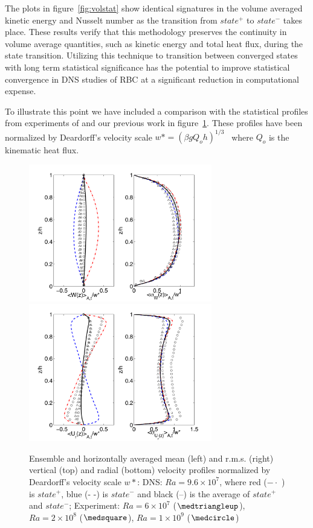 \documentclass[twocolumn,10pt]{tsfp}
\begin{document}
The plots in figure~\ref{fig:volstat} show identical signatures in the volume averaged kinetic energy and Nusselt number as the transition from $state^+$ to $state^-$ takes place.  These results verify that this methodology preserves the continuity in volume average quantities, such as kinetic energy and total heat flux, during the state transition.
Utilizing this technique to transition between converged states with long term statistical significance has the potential to improve statistical convergence in DNS studies of RBC at a significant reduction in computational expense.  
 
To illustrate this point we have included a comparison with the statistical profiles from experiments of \cite{fernandes2001spatial} and our previous work \citep{sakievich2016large} in figure~\ref{fig:profs}. These profiles have been normalized by Deardorff's velocity scale $w*=(\beta g Q_o h)^{1/3}$~\citep{deardorff1970convective} where $Q_o$ is the kinematic heat flux.
\begin{figure}
\centering
\includegraphics[height=6cm]{PRL_Fig1}
\includegraphics[height=6cm]{PRL_Fig2}
\caption{Ensemble and horizontally averaged mean (left) and r.m.s. (right) vertical (top) and radial (bottom) velocity profiles normalized by Deardorff's velocity scale $w*$: DNS: $Ra=9.6\times10^7$, where red ($- \cdot$ ) is $state^+$, blue (- -) is $state^-$ and black (--) is the average of $state^+$ and $state^-$; Experiment: $Ra=6\times10^7$ ($\medtriangleup$), $Ra=2\times10^8$ ($\medsquare$),  $Ra=1\times10^9$ ($\medcircle$)}
\label{fig:profs}
\end{figure}
\end{document}

